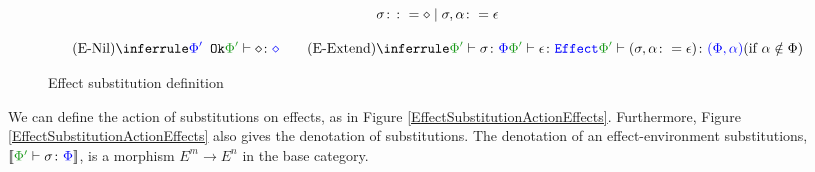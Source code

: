 \documentclass{Report}
\begin{document}
\begin{figure}[H]
    \centering
    \begin{framed}
        \[
    \sigma \colon\colon= \diamond \mid \sigma, \alpha \colon= \epsilon    
\]



\[
    \ntreeruleI{\esubnil}{\ok{\P'}}{\typerelation{\P'}{\nil}{\nil}}
    \quad\quad
    \condtreeruleII{\esubextend}{\typerelation{\P'}{\si}{\P}}{\wellformedeffect{\P'}{\e}}{\typerelation{\P'}{(\si, \a \setto\e)}{(\P, \a)}}{\a\notin\P}
\]
    \end{framed}
    
    \caption{Effect substitution definition}
    \label{EffectSubstitutionDefinition}
\end{figure}


We can define the action of substitutions on effects, as in Figure \ref{EffectSubstitutionActionEffects}. Furthermore, Figure \ref{EffectSubstitutionActionEffects} also gives the denotation of substitutions. The denotation of an effect-environment substitutions, $\deno{\typerelation{\P'}{\si}{\P}}$, is a morphism $E^m \rightarrow E^n$ in the base category.
\end{document}
